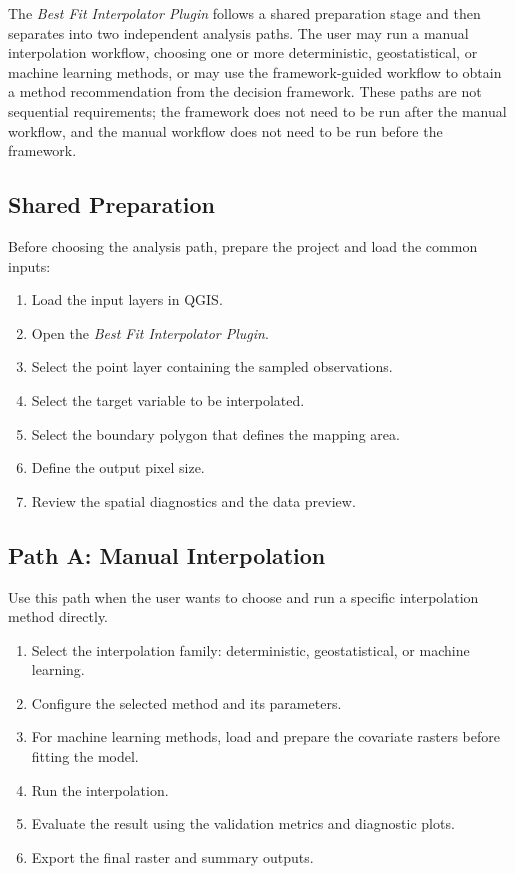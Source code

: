 \documentclass[11pt,a4paper]{article}
\begin{document}
The \textit{Best Fit Interpolator Plugin} follows a shared preparation stage and then separates into two independent analysis paths. The user may run a manual interpolation workflow, choosing one or more deterministic, geostatistical, or machine learning methods, or may use the framework-guided workflow to obtain a method recommendation from the decision framework. These paths are not sequential requirements; the framework does not need to be run after the manual workflow, and the manual workflow does not need to be run before the framework.


\subsection{Shared Preparation}


Before choosing the analysis path, prepare the project and load the common inputs:


\begin{enumerate}
    \item Load the input layers in QGIS.
    \item Open the \textit{Best Fit Interpolator Plugin}.
    \item Select the point layer containing the sampled observations.
    \item Select the target variable to be interpolated.
    \item Select the boundary polygon that defines the mapping area.
    \item Define the output pixel size.
    \item Review the spatial diagnostics and the data preview.
\end{enumerate}


\subsection{Path A: Manual Interpolation}


Use this path when the user wants to choose and run a specific interpolation method directly.


\begin{enumerate}
    \item Select the interpolation family: deterministic, geostatistical, or machine learning.
    \item Configure the selected method and its parameters.
    \item For machine learning methods, load and prepare the covariate rasters before fitting the model.
    \item Run the interpolation.
    \item Evaluate the result using the validation metrics and diagnostic plots.
    \item Export the final raster and summary outputs.
\end{enumerate}
\end{document}
